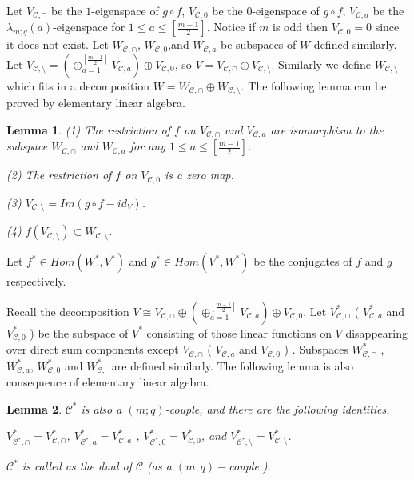\def\CTEXPreproc{Created by ctex v0.2.12, don't edit!}\documentclass[11pt]{article}
\newtheorem{lem}{Lemma}[section]
\begin{document}
Let $V_{\mathscr{C}, \cap }$  be the $1$-eigenspace of $g\circ f$, $V_{\mathscr{C},0}$ be the $0$-eigenspace of $g\circ f$,
$V_{\mathscr{C},a}$ be the $\lambda_{m;q}(a) $-eigenspace for $1\leq a\leq [\frac{m-1}{2}]$. Notice if $m$ is odd then $V_{\mathscr{C},0}=0$
 since it does not exist. Let $W_{\mathscr{C}, \cap }$, $W_{\mathscr{C},0}$,and $W_{\mathscr{C},a}$ be subspaces of $W$ defined similarly. Let
$V_{\mathscr{C}, \setminus }= ( \oplus^{[\frac{m-1}{2}]} _{a=1}  V_{\mathscr{C}, a} )\oplus V_{\mathscr{C} ,0}  $, so
$V= V_{\mathscr{C},\cap } \oplus V_{\mathscr{C}, \setminus }$. Similarly we define $W_{\mathscr{C}, \setminus }$ which fits in a decomposition
$W= W_{\mathscr{C},\cap } \oplus W_{\mathscr{C}, \setminus }$.  The following lemma can be proved by elementary linear algebra.

\begin{lem}
(1) The restriction of $f$ on $V_{\mathscr{C},\cap }$ and $V_{\mathscr{C}, a}$  are isomorphism to the subspace $W_{\mathscr{C},\cap }$ and $W_{\mathscr{C}, a}$ for any $1\leq a\leq [\frac{m-1}{2}]$.

\noindent(2) The restriction of $f$ on $V_{\mathscr{C},0 }$ is a zero map.

\noindent(3) $V_{\mathscr{C},\setminus }= Im ( g\circ f - id_{V}  )$.

\noindent(4) $f ( V_{\mathscr{C}, \setminus }  )\subset W_{\mathscr{C}, \setminus } $.



\end{lem}


Let $f^{*} \in Hom(W^* , V^* )$ and $g^* \in Hom (V^* , W^* )$ be the conjugates of $f$ and $g$ respectively.

Recall the decomposition $V\cong V_{\mathscr{C},\cap } \oplus  ( \oplus^{[\frac{m-1}{2}]} _{a=1}  V_{\mathscr{C}, a} )\oplus V_{\mathscr{C} ,0}$. Let $V^* _{\mathscr{C},\cap } $  ( $V^* _{\mathscr{C},a } $ and $V^* _{\mathscr{C},0 }  $ ) be the subspace of $V^* $ consisting of those linear functions on $V$ disappearing over direct sum components except  $V _{\mathscr{C},\cap } $ (  $V _{\mathscr{C},a } $ and $V _{\mathscr{C},0 }  $ ) . Subspaces $W^* _{\mathscr{C},\cap } $  , $W^* _{\mathscr{C},a } $, $W^* _{\mathscr{C},0 }  $  and $W^* _{\mathscr{C}, \  }$ are defined similarly. The following lemma is also consequence of elementary linear algebra.

\begin{lem}

$\mathscr{C}^{*} $ is also a $(m;q)$-couple, and there are the following identities.

 $ V^* _{ \mathscr{C}^{*} , \cap    }  = V^* _{\mathscr{C},\cap }  $, $ V^* _{ \mathscr{C}^{*} , a   }  = V^* _{\mathscr{C},a }  $ ,
$ V^* _{ \mathscr{C}^{*} , 0    }  = V^* _{\mathscr{C},0 }  $, and  $ V^* _{ \mathscr{C}^{*} , \setminus   }  = V^* _{\mathscr{C},\setminus }  $.

$\mathscr{C}^{*} $ is called as the dual of $\mathscr{C}$ (as a $(m;q)-$couple ).

\end{lem}
\end{document}
